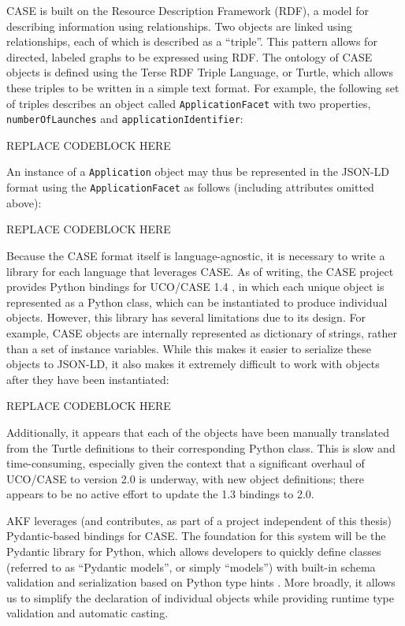 CASE is built on the Resource Description Framework (RDF), a model for
describing information using relationships. Two objects are linked using
relationships, each of which is described as a ``triple''. This pattern
allows for directed, labeled graphs to be expressed using RDF. The
ontology of CASE objects is defined using the Terse RDF Triple Language,
or Turtle, which allows these triples to be written in a simple text
format. For example, the following set of triples describes an object
called \texttt{ApplicationFacet} with two properties,
\texttt{numberOfLaunches} and \texttt{applicationIdentifier}:

REPLACE CODEBLOCK HERE

An instance of a \texttt{Application} object may thus be represented in
the JSON-LD format using the \texttt{ApplicationFacet} as follows
(including attributes omitted above):

REPLACE CODEBLOCK HERE

Because the CASE format itself is language-agnostic, it is necessary to
write a library for each language that leverages CASE. As of writing,
the CASE project provides Python bindings for UCO/CASE 1.4
\cite{CaseworkCASEMappingPython}, in which each unique object is
represented as a Python class, which can be instantiated to produce
individual objects. However, this library has several limitations due to
its design. For example, CASE objects are internally represented as
dictionary of strings, rather than a set of instance variables. While
this makes it easier to serialize these objects to JSON-LD, it also
makes it extremely difficult to work with objects after they have been
instantiated:

REPLACE CODEBLOCK HERE

Additionally, it appears that each of the objects have been manually
translated from the Turtle definitions to their corresponding Python
class. This is slow and time-consuming, especially given the context
that a significant overhaul of UCO/CASE to version 2.0 is underway, with
new object definitions; there appears to be no active effort to update
the 1.3 bindings to 2.0.

AKF leverages (and contributes, as part of a project independent of this
thesis) Pydantic-based bindings for CASE. The foundation for this system
will be the Pydantic library for Python, which allows developers to
quickly define classes (referred to as ``Pydantic models'', or simply
``models'') with built-in schema validation and serialization based on
Python type hints \cite{colvinPydantic2024}. More broadly, it allows
us to simplify the declaration of individual objects while providing
runtime type validation and automatic casting.

